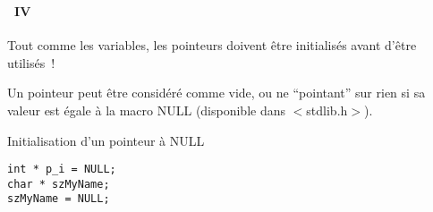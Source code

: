 \begin{frame}[containsverbatim]
  \frametitle{\secname}
  \framesubtitle{\subsecname~IV}

  Tout comme les variables, les pointeurs doivent être initialisés avant d'être utilisés~!
  \vspace{0.5cm}
  \par
  Un pointeur peut être considéré comme vide, ou ne ``pointant'' sur rien si sa valeur est égale à la macro NULL (disponible dans 
  $<$stdlib.h$>$).
  
  \begin{exampleblock}{Initialisation d'un pointeur à NULL}
    \begin{verbatim}
int * p_i = NULL;
char * szMyName;
szMyName = NULL;\end{verbatim}
  \end{exampleblock}
\end{frame}

